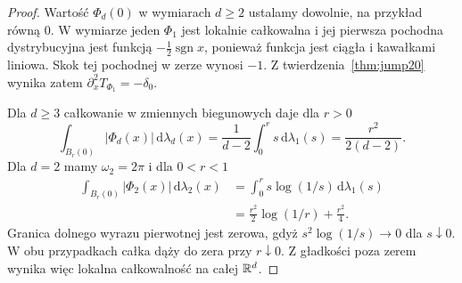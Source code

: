 \begin{proof}
Wartość $\Phi_d(0)$ w wymiarach $d\ge2$ ustalamy
dowolnie, na przykład równą $0$.
W wymiarze jeden $\Phi_1$ jest lokalnie całkowalna
i jej pierwsza pochodna dystrybucyjna jest funkcją
$-\tfrac12\operatorname{sgn}x$, ponieważ funkcja jest ciągła
i kawałkami liniowa. Skok tej pochodnej w zerze wynosi $-1$.
Z twierdzenia~\ref{thm:jump20} wynika zatem
$\partial_x^2T_{\Phi_1}=-\delta_0$.

Dla $d\ge3$ całkowanie w zmiennych biegunowych daje
dla $r>0$
\[
 \int_{B_r(0)}|\Phi_d(x)|\,\mathrm d\lambda_d(x)
 =\frac1{d-2}\int_0^r s\,\mathrm d\lambda_1(s)
 =\frac{r^2}{2(d-2)}.
\]
Dla $d=2$ mamy $\omega_2=2\pi$ i dla $0<r<1$
\[
 \begin{aligned}
 \int_{B_r(0)}|\Phi_2(x)|\,\mathrm d\lambda_2(x)
 &=\int_0^r s\log(1/s)\,\mathrm d\lambda_1(s)\\
 &=\frac{r^2}{2}\log(1/r)+\frac{r^2}{4}.
 \end{aligned}
\]
Granica dolnego wyrazu pierwotnej jest zerowa,
gdyż $s^2\log(1/s)\to0$ dla $s\downarrow0$.
W obu przypadkach całka dąży do zera przy $r\downarrow0$.
Z gładkości poza zerem wynika więc lokalna
całkowalność na całej $\mathbb R^d$.


\end{proof}
